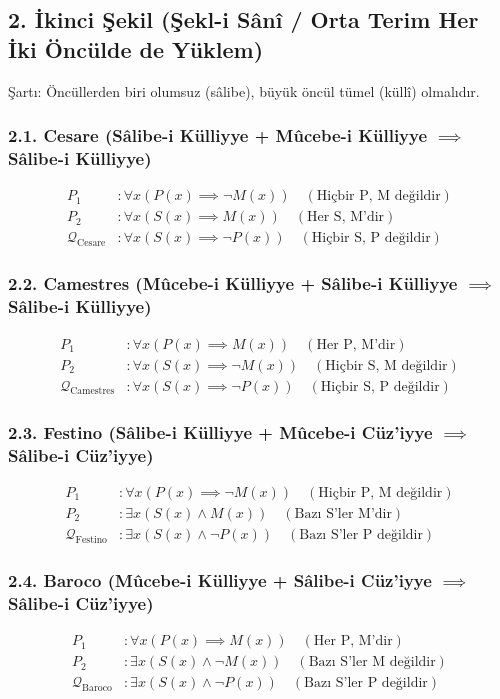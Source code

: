 \documentclass[11pt, a4paper]{article}
\begin{document}
\subsection{2. İkinci Şekil (Şekl-i Sânî / Orta Terim Her İki Öncülde de Yüklem)}
Şartı: Öncüllerden biri olumsuz (sâlibe), büyük öncül tümel (küllî) olmalıdır.

\subsubsection{2.1. Cesare (Sâlibe-i Külliyye + Mûcebe-i Külliyye $\implies$ Sâlibe-i Külliyye)}
\begin{align}
P_1 &: \forall x (P(x) \implies \neg M(x)) \quad (\text{Hiçbir P, M değildir}) \\
P_2 &: \forall x (S(x) \implies M(x)) \quad (\text{Her S, M'dir}) \\
\mathcal{Q}_{\text{Cesare}} &: \forall x (S(x) \implies \neg P(x)) \quad (\text{Hiçbir S, P değildir})
\end{align}

\subsubsection{2.2. Camestres (Mûcebe-i Külliyye + Sâlibe-i Külliyye $\implies$ Sâlibe-i Külliyye)}
\begin{align}
P_1 &: \forall x (P(x) \implies M(x)) \quad (\text{Her P, M'dir}) \\
P_2 &: \forall x (S(x) \implies \neg M(x)) \quad (\text{Hiçbir S, M değildir}) \\
\mathcal{Q}_{\text{Camestres}} &: \forall x (S(x) \implies \neg P(x)) \quad (\text{Hiçbir S, P değildir})
\end{align}

\subsubsection{2.3. Festino (Sâlibe-i Külliyye + Mûcebe-i Cüz'iyye $\implies$ Sâlibe-i Cüz'iyye)}
\begin{align}
P_1 &: \forall x (P(x) \implies \neg M(x)) \quad (\text{Hiçbir P, M değildir}) \\
P_2 &: \exists x (S(x) \land M(x)) \quad (\text{Bazı S'ler M'dir}) \\
\mathcal{Q}_{\text{Festino}} &: \exists x (S(x) \land \neg P(x)) \quad (\text{Bazı S'ler P değildir})
\end{align}

\subsubsection{2.4. Baroco (Mûcebe-i Külliyye + Sâlibe-i Cüz'iyye $\implies$ Sâlibe-i Cüz'iyye)}
\begin{align}
P_1 &: \forall x (P(x) \implies M(x)) \quad (\text{Her P, M'dir}) \\
P_2 &: \exists x (S(x) \land \neg M(x)) \quad (\text{Bazı S'ler M değildir}) \\
\mathcal{Q}_{\text{Baroco}} &: \exists x (S(x) \land \neg P(x)) \quad (\text{Bazı S'ler P değildir})
\end{align}
\end{document}
